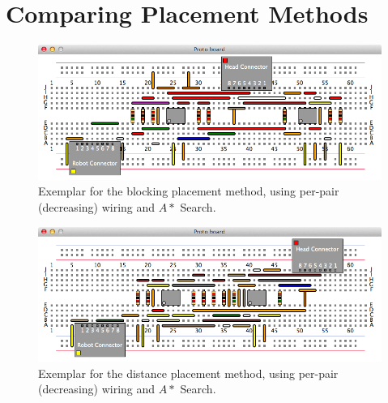 \section{Comparing Placement Methods}
\label{sec:compare_placement}

\begin{figure}[H]
\begin{center}
\includegraphics[width=\textwidth]{Images/exemplar_per_pair_decreasing.png}
\caption[Blocking placement method exemplar]{Exemplar for the blocking placement
method, using per-pair (decreasing) wiring and $A*$ Search.}
\end{center}
\end{figure}

\begin{figure}[H]
\begin{center}
\includegraphics[width=\textwidth]{Images/exemplar_distance.png}
\caption[Distance placement method exemplar]{Exemplar for the distance placement
method,
using per-pair (decreasing) wiring and $A*$ Search.}
\end{center}
\end{figure}

